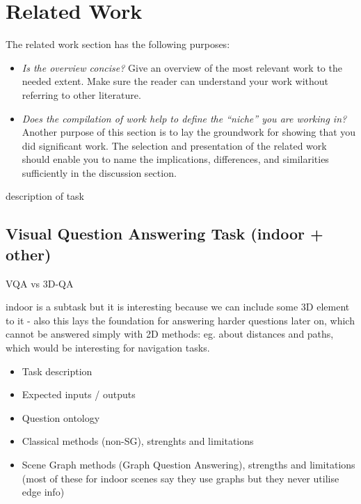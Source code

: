 %

\newpage
\chapter{Related Work}

The related work section has the following purposes: 

\begin{itemize}
 \item \textit{Is the overview concise?} Give an overview of the most relevant work to the needed extent. Make sure the reader can understand your work without referring to other literature.
 \item \textit{Does the compilation of work help to define the ``niche'' you are working in?} Another purpose of this section is to lay the groundwork for showing that you did significant work. The selection and presentation of the related work should enable you to name the implications, differences, and similarities sufficiently in the discussion section.
\end{itemize}

description of task
\section{Visual Question Answering Task (indoor + other)}

VQA vs 3D-QA

indoor is a subtask but it is interesting because we can include some 3D element to it
- also this lays the foundation for answering harder questions later on, which cannot be answered simply with 2D methods: eg. about distances and paths, which would be interesting for navigation tasks.
\begin{itemize}
    \item Task description
    \item Expected inputs / outputs
    \item Question ontology
    \item Classical methods (non-SG), strenghts and limitations
    \item Scene Graph methods (Graph Question Answering), strengths and limitations (most of these for indoor scenes say they use graphs but they never utilise edge info)
\end{itemize}

